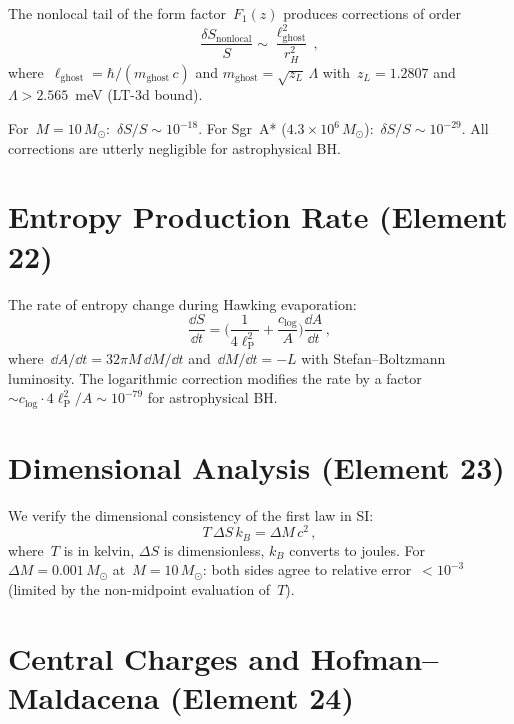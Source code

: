 \documentclass[11pt,a4paper]{article}
\newcommand{\lP}{\ell_{\mathrm{P}}}
\newcommand{\Msun}{M_\odot}
\newcommand{\clog}{c_{\log}}
\begin{document}
The nonlocal tail of the form factor~$F_1(z)$ produces corrections
of order
\[
  \frac{\delta S_{\mathrm{nonlocal}}}{S}
  \sim \frac{\ell_{\mathrm{ghost}}^2}{r_H^2}\,,
\]
where~$\ell_{\mathrm{ghost}} = \hbar/(m_{\mathrm{ghost}}\,c)$ and
$m_{\mathrm{ghost}} = \sqrt{z_L}\,\Lambda$ with~$z_L = 1.2807$
and~$\Lambda > 2.565$~meV (LT-3d bound).

For~$M = 10\,\Msun$:~$\delta S/S \sim 10^{-18}$.
For Sgr~A* ($4.3\times 10^6\,\Msun$):~$\delta S/S \sim 10^{-29}$.
All corrections are utterly negligible for astrophysical BH.

\section{Entropy Production Rate (Element 22)}\label{sec:rate}

The rate of entropy change during Hawking evaporation:
\[
  \frac{\dd S}{\dd t} = \biggl(\frac{1}{4\lP^2} + \frac{\clog}{A}\biggr)
  \frac{\dd A}{\dd t}\,,
\]
where~$\dd A/\dd t = 32\pi M\,\dd M/\dd t$ and~$\dd M/\dd t = -L$
with Stefan--Boltzmann luminosity.  The logarithmic correction
modifies the rate by a factor~$\sim \clog\cdot 4\lP^2/A \sim 10^{-79}$
for astrophysical BH.

\section{Dimensional Analysis (Element 23)}\label{sec:dimensions}

We verify the dimensional consistency of the first law in SI:
\[
  T\,\Delta S\, k_B = \Delta M\, c^2\,,
\]
where~$T$ is in kelvin, $\Delta S$ is dimensionless, $k_B$ converts
to joules.  For~$\Delta M = 0.001\,\Msun$ at~$M = 10\,\Msun$:
both sides agree to relative error~$< 10^{-3}$ (limited by the
non-midpoint evaluation of~$T$).

\section{Central Charges and Hofman--Maldacena (Element 24)}
\label{sec:central}
\end{document}
